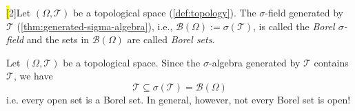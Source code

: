 \begin{definition}\label{def:borel-sigma-field}
\hl[2]{Let $(\Omega,\mathcal{T})$ be a topological space (\autoref{def:topology}).
The $\sigma$-field generated by $\mathcal{T}$ (\autoref{thm:generated-sigma-algebra}), i.e., $\mathcal{B}(\Omega) := \sigma(\mathcal{T})$, is called the \emph{Borel $\sigma$-field} and the sets in $\mathcal{B}(\Omega)$ are called \emph{Borel sets}.}
\end{definition}

\begin{caution}
Let $(\Omega,\mathcal{T})$ be a topological space.
Since the $\sigma$-algebra generated by $\mathcal{T}$ contains $\mathcal{T}$,
we have
\[
\mathcal{T} \subseteq \sigma(\mathcal{T}) = \mathcal{B}(\Omega)
\]
i.e. every open set is a Borel set. 
In general, however, not every Borel set is open!
\end{caution}

